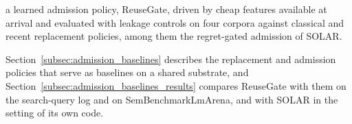 
a learned admission policy, ReuseGate, driven by cheap features available at arrival and evaluated with leakage controls on four corpora against classical and recent replacement policies, among them the regret-gated admission of SOLAR.

Section~\ref{subsec:admission_baselines} describes the replacement and admission policies that serve as baselines on a shared substrate, and Section~\ref{subsec:admission_baselines_results} compares ReuseGate with them on the search-query log and on SemBenchmarkLmArena, and with SOLAR in the setting of its own code.

